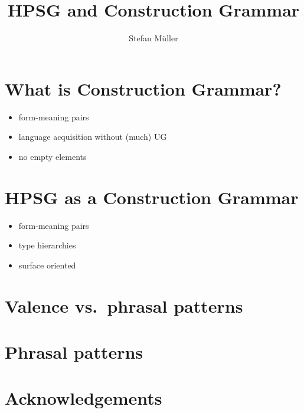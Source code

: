 \documentclass[output=paper]{langsci/langscibook}
\author{Stefan Müller\affiliation{Humboldt-Universität zu Berlin}}
\title{HPSG and Construction Grammar}
\begin{document}
\section{What is Construction Grammar?}

\citet{Michaelis2012a}

\begin{itemize}
\item form-meaning pairs
\item language acquisition without (much) UG
\item no empty elements
\end{itemize}

\section{HPSG as a Construction Grammar}

\begin{itemize}
\item form-meaning pairs
\item type hierarchies
\item surface oriented
\end{itemize}

\section{Valence vs.\ phrasal patterns}
 
\citet{Mueller2006d,MWArgSt,MuellerLFGphrasal}

\section{Phrasal patterns}

\section*{Acknowledgements}

\printbibliography[heading=subbibliography,notkeyword=this] 
\end{document}

